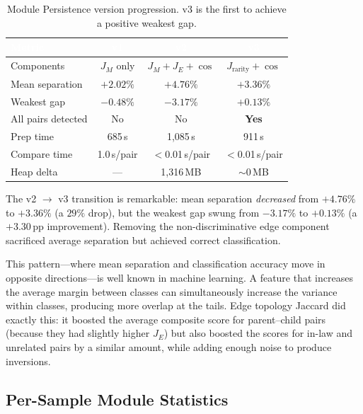 \documentclass{../yalumba}
\begin{document}
\begin{table}[H]
\centering
\tablestyle
\caption{Module Persistence version progression.  v3 is the first to achieve
  a positive weakest gap.}
\label{tab:progression}
\begin{tabular}{@{}lccc@{}}
\toprule
\rowcolor{table-header}
\textcolor{white}{\textbf{Metric}} &
\textcolor{white}{\textbf{v1}} &
\textcolor{white}{\textbf{v2}} &
\textcolor{white}{\textbf{v3}} \\
\midrule
Components & $J_M$ only & $J_M + J_E + \cos$ & $J_{\text{rarity}} + \cos$ \\
Mean separation & $+2.02\%$ & $+4.76\%$ & $+3.36\%$ \\
Weakest gap & $-0.48\%$ & $-3.17\%$ & $+0.13\%$ \\
All pairs detected & No & No & \textbf{Yes} \\
Prep time & 685\,s & 1{,}085\,s & 911\,s \\
Compare time & 1.0\,s/pair & $<$0.01\,s/pair & $<$0.01\,s/pair \\
Heap delta & --- & 1{,}316\,MB & $\sim$0\,MB \\
\bottomrule
\end{tabular}
\end{table}

\begin{keyfinding}
The v2 $\to$ v3 transition is remarkable: mean separation \emph{decreased}
from $+4.76\%$ to $+3.36\%$ (a $29\%$ drop), but the weakest gap swung from
$-3.17\%$ to $+0.13\%$ (a $+3.30$\,pp improvement).  Removing the
non-discriminative edge component sacrificed average separation but achieved
correct classification.
\end{keyfinding}

This pattern---where mean separation and classification accuracy move in
opposite directions---is well known in machine learning.  A feature that
increases the average margin between classes can simultaneously increase
the variance within classes, producing more overlap at the tails.  Edge
topology Jaccard did exactly this: it boosted the average composite score
for parent--child pairs (because they had slightly higher $J_E$) but also
boosted the scores for in-law and unrelated pairs by a similar amount, while
adding enough noise to produce inversions.

\subsection{Per-Sample Module Statistics}
\end{document}
